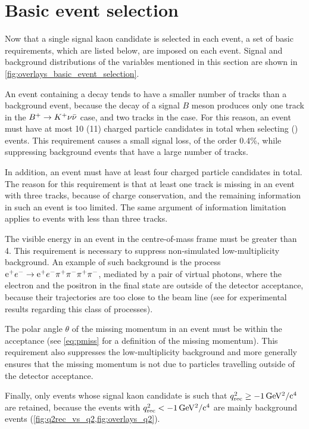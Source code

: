 \section{Basic event selection} \label{sec:basic_event_selection}
Now that a single signal kaon candidate is selected in each event, a set of basic requirements, which are listed below, are imposed on each event.
Signal and background distributions of the variables mentioned in this section are shown in \cref{fig:overlays_basic_event_selection}.
\bi
\item An event containing a \BKnn decay tends to have a smaller number of tracks than a background event, because the decay of a signal $B$ meson produces only one track in the $B^+\rightarrow K^+\nu\bar{\nu}$ case, and two tracks in the \BKznn case.
For this reason, an event must have at most 10 (11) charged particle candidates in total when selecting \BKpnn (\BKznn) events.
This requirement causes a small signal loss, of the order 0.4\%, while suppressing background events that have a large number of tracks.
\item In addition, an event must have at least four charged particle candidates in total.
The reason for this requirement is that at least one track is missing in an event with three tracks, because of charge conservation, and the remaining information in such an event is too limited.
The same argument of information limitation applies to events with less than three tracks.
\item The visible energy in an event in the centre-of-mass frame must be greater than 4\gev.
This requirement is necessary to suppress non-simulated low-multiplicity background.
An example of such background is the process $\mathrm{e}^+e^-\rightarrow\mathrm{e}^+e^-\pi^+\pi^-\pi^+\pi^-$, mediated by a pair of virtual photons, where the electron and the positron in the final state are outside of the detector acceptance, because their trajectories are too close to the beam line (see \cite{L3:2005dor, Belle:2007qae, Belle:2013eck} for experimental results regarding this class of processes).
\item The polar angle $\theta$ of the missing momentum in an event must be within the \CDC acceptance (see \cref{eq:pmiss} for a definition of the missing momentum).
This requirement also suppresses the low-multiplicity background and more generally ensures that the missing momentum is not due to particles travelling outside of the detector acceptance.
\item Finally, only events whose signal kaon candidate is such that $q_{\mathrm{rec}}^2\ge-1\,\mathrm{GeV^2/c^4}$ are retained, because the events with $q_{\mathrm{rec}}^2<-1\,\mathrm{GeV^2/c^4}$ are mainly background events (\cref{fig:q2rec_vs_q2,fig:overlays_q2}).
